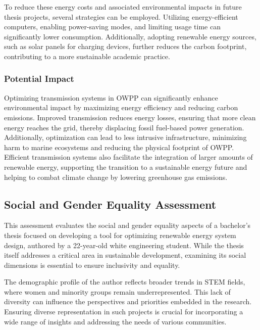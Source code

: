 \documentclass[a4paper,11pt, titlepage, twoside]{article}
\begin{document}
To reduce these energy costs and associated environmental impacts in future thesis projects, several strategies can be employed.
Utilizing energy-efficient computers, enabling power-saving modes, and limiting usage time can significantly lower consumption.
Additionally, adopting renewable energy sources, such as solar panels for charging devices, further reduces the carbon footprint,
contributing to a more sustainable academic practice.

\subsubsection{Potential Impact}

Optimizing transmission systems in OWPP can significantly enhance environmental impact by maximizing energy efficiency
and reducing carbon emissions. Improved transmission reduces energy losses, ensuring that more clean energy reaches the grid, thereby displacing fossil
fuel-based power generation. Additionally, optimization can lead to less intrusive infrastructure, minimizing harm to marine ecosystems and reducing the physical footprint of OWPP.
Efficient transmission systems also facilitate the integration of larger amounts of renewable energy, supporting the transition to a sustainable energy future and helping to combat climate change by lowering
greenhouse gas emissions.









\subsection{Social and Gender Equality Assessment}

This assessment evaluates the social and gender equality aspects of a bachelor's thesis focused on developing a tool for optimizing renewable energy system design, authored by a 22-year-old white engineering student. While the thesis itself addresses a critical area in sustainable development, examining its social dimensions is essential to ensure inclusivity and equality.

The demographic profile of the author reflects broader trends in STEM fields, where women and minority groups remain underrepresented. This lack of diversity can influence the perspectives and priorities embedded in the research. Ensuring diverse representation in such projects is crucial for incorporating a wide range of insights and addressing the needs of various communities.
\end{document}
